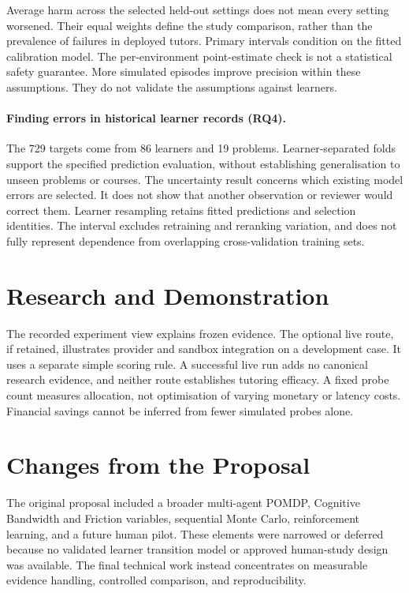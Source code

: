 Average harm across the selected held-out settings does not mean every setting worsened. Their equal weights define the study
comparison, rather than the prevalence of failures in deployed tutors. Primary intervals condition on the fitted calibration
model. The per-environment point-estimate check is not a statistical safety guarantee. More simulated episodes improve precision
within these assumptions. They do not validate the assumptions against learners.

\paragraph{Finding errors in historical learner records (RQ4).}
The 729 targets come from 86 learners and 19 problems. Learner-separated folds support the specified prediction evaluation,
without establishing generalisation to unseen problems or courses. The uncertainty result concerns which existing model errors
are selected. It does not show that another observation or reviewer would correct them. Learner resampling retains fitted
predictions and selection identities. The interval excludes retraining and reranking variation, and does not fully represent
dependence from overlapping cross-validation training sets.

\section{Research and Demonstration}

The recorded experiment view explains frozen evidence. The optional live route, if retained, illustrates provider and sandbox
integration on a development case. It uses a separate simple scoring rule. A successful live run adds no canonical research
evidence, and neither route establishes tutoring efficacy. A fixed probe count measures allocation, not optimisation of varying
monetary or latency costs. Financial savings cannot be inferred from fewer simulated probes alone.

\section{Changes from the Proposal}

The original proposal included a broader multi-agent POMDP, Cognitive Bandwidth and Friction variables, sequential Monte Carlo,
reinforcement learning, and a future human pilot. These elements were narrowed or deferred because no validated learner transition
model or approved human-study design was available. The final technical work instead concentrates on measurable evidence handling,
controlled comparison, and reproducibility.
